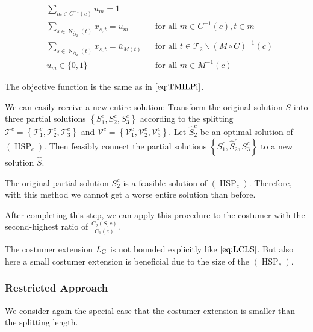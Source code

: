 \begin{align}
	& \sum_{m\in C^{-1}(c)} u_m = 1 \label{eq:HSP:costumer} \\
	& \sum_{s\in\operatorname{N}_{\overline{G}_2}^-(t)} x_{s,t} = u_m && \text{for all } m\in C^{-1}(c),t\in m \label{eq:HSP:route} \\
	& \sum_{s\in\operatorname{N}_{\overline{G}_2}^-(t)} x_{s,t} = \bar{u}_{M(t)} && \text{for all } t\in\mathcal{T}_2\backslash(M\circ C)^{-1}(c) \label{eq:HSP:route_fix} \\
	& u_m\in\{0,1\} && \text{for all } m\in M^{-1}(c) \label{eq:HSP:um}
\end{align}

The objective function is the same as in $\eqref{eq:TMILPi}$.

We can easily receive a new entire solution: Transform the original solution $S$ into three partial solutions $\left\{S^c_1,S^c_2,S^c_3\right\}$ according to the splitting $\mathcal{T}^c=\left\{\mathcal{T}^c_1,\mathcal{T}^c_2,\mathcal{T}^c_3\right\}$ and $\mathcal{V}^c=\left\{\mathcal{V}^c_1,\mathcal{V}^c_2,\mathcal{V}^c_3\right\}$. Let $\hat{S}^c_2$ be an optimal solution of $(\operatorname{HSP}_c)$. Then feasibly connect the partial solutions $\left\{S^c_1,\hat{S}^c_2,S^c_3\right\}$ to a new solution $\hat{S}$. 

The original partial solution $S^c_2$ is a feasible solution of $(\operatorname{HSP}_c)$. Therefore, with this method we cannot get a worse entire solution than before.

After completing this step, we can apply this procedure to the costumer with the second-highest ratio of $\frac{C_2(S,c)}{C_1(c)}$.

\begin{remark}

The costumer extension $L_{\operatorname{C}}$ is not bounded explicitly like $\eqref{eq:LCLS}$. But also here a small costumer extension is beneficial due to the size of the $(\operatorname{HSP}_c)$.

\end{remark}


\subsubsection{Restricted Approach}

We consider again the special case that the costumer extension is smaller than the splitting length. 

